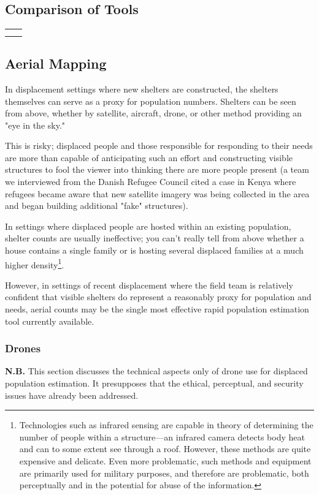 \documentclass[a4paper,12pt,twoside]{article}
\begin{document}
\subsection{Comparison of Tools}

\begin{tabular}{c|c}
     &  \\
     & 
\end{tabular}

\subsection{Aerial Mapping}
In displacement settings where new shelters are constructed, the shelters themselves can serve as a proxy for population numbers. Shelters can be seen from above, whether by satellite, aircraft, drone, or other method providing an "eye in the sky." 

This is risky; displaced people and those responsible for responding to their needs are more than capable of anticipating such an effort and constructing visible structures to fool the viewer into thinking there are more people present (a team we interviewed from the Danish Refugee Council cited a case in Kenya where refugees became aware that new satellite imagery was being collected in the area and began building additional "fake" structures).

In settings where displaced people are hosted within an existing population, shelter counts are usually ineffective; you can't really tell from above whether a house contains a single family or is hosting several displaced families at a much higher density\footnote{Technologies such as infrared sensing are capable in theory of determining the number of people within a structure---an infrared camera detects body heat and can to some extent see through a roof. However, these methods are quite expensive and delicate. Even more problematic, such methods and equipment are primarily used for military purposes, and therefore are problematic, both perceptually and in the potential for abuse of the information.}. 

However, in settings of recent displacement where the field team is relatively confident that visible shelters do represent a reasonably proxy for population and needs, aerial counts may be the single most effective rapid population estimation tool currently available. 

\subsubsection{Drones}
\textbf{N.B.} This section discusses the technical aspects only of drone use for displaced population estimation. It presupposes that the ethical, perceptual, and security issues have already been addressed. 
\end{document}
